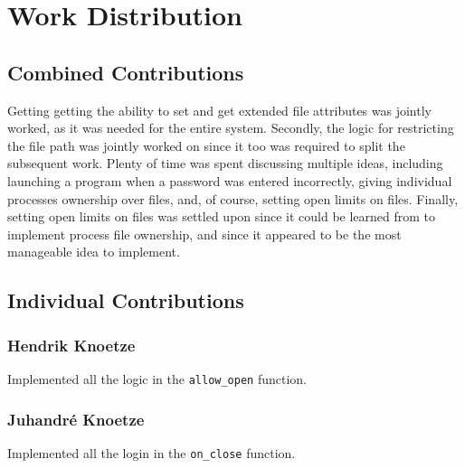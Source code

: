 \section{Work Distribution}

\subsection{Combined Contributions}

Getting getting the ability to set and get extended file attributes was jointly worked, as it was needed for the entire system. Secondly, the logic for restricting the file path was jointly worked on since it too was required to split the subsequent work. Plenty of time was spent discussing multiple ideas, including launching a program when a password was entered incorrectly, giving individual processes ownership over files, and, of course, setting open limits on files. Finally, setting open limits on files was settled upon since it could be learned from to implement process file ownership, and since it appeared to be the most manageable idea to implement.

\subsection{Individual Contributions}

\subsubsection*{Hendrik Knoetze}

Implemented all the logic in the \texttt{allow\_open} function.

\subsubsection*{Juhandr\'e Knoetze}

Implemented all the login in the \texttt{on\_close} function.


